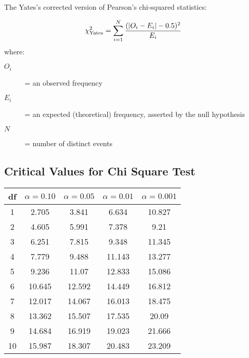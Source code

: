\begin{framed}
\large 
\noindent The Yates's corrected version of Pearson's chi-squared statistics:

\[{\displaystyle \chi _{\text{Yates}}^{2}=\sum _{i=1}^{N}{(|O_{i}-E_{i}|-0.5)^{2} \over E_{i}}} \]
where:
\begin{description}
\item[$O_i$] = an observed frequency
\item[$E_i$] = an expected (theoretical) frequency, asserted by the null hypothesis
\item[$N$] = number of distinct events
\end{description}
\end{framed}

\subsection*{Critical Values for Chi Square Test}
{
	\large
\begin{center}
\begin{tabular}{|c|c|c|c|c|}
	\hline 
df	&	$\alpha=0.10$	&	$\alpha=0.05$	&	$\alpha=0.01$	&	$\alpha=0.001$	\\ \hline
1	& 	2.705	&	3.841	&	6.634	&	10.827	\\ \hline
2	&	4.605	&	5.991	&	7.378	&	9.21	\\ \hline
3	&	6.251	&	7.815	&	9.348	&	11.345	\\ \hline
4	&	7.779	&	9.488	&	11.143	&	13.277	\\ \hline
5	&	9.236	&	11.07	&	12.833	&	15.086	\\ \hline
6	&	10.645	&	12.592	&	14.449	&	16.812	\\ \hline
7	&	12.017	&	14.067	&	16.013	&	18.475	\\ \hline
8	&	13.362	&	15.507	&	17.535	&	20.09	\\ \hline
9	&	14.684	&	16.919	&	19.023	&	21.666	\\ \hline
10	&	15.987	&	18.307	&	20.483	&	23.209	\\ \hline
\end{tabular} 
\end{center}
}


